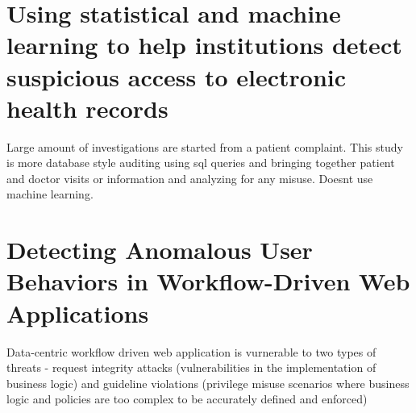 \documentclass[12pt]{article}
\begin{document}
\section{Using statistical and machine learning to help institutions detect suspicious access to electronic health records}
Large amount of investigations are started from a patient complaint.  \cite{Fabbri:2011:EA:2047485.2047486} 
This study is more database style auditing using sql queries and bringing together patient and doctor visits or information and analyzing for any misuse. Doesnt use machine learning. 

\section{Detecting Anomalous User Behaviors in Workflow-Driven Web Applications}
Data-centric workflow driven web application is vurnerable to two types of threats - request integrity attacks (vulnerabilities in the implementation of business logic) and guideline violations (privilege misuse scenarios where business logic and policies are too complex to be accurately defined and enforced) \cite{6424834}



\footnotesize

\end{document}
